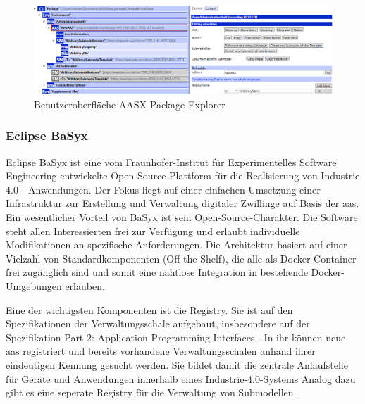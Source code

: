 \begin{figure}[htbp]
    \centering
    \includegraphics[width=1\textwidth]{Bilder/AAS_PE.PNG}
    \caption{Benutzeroberfläche AASX Package Explorer}
    \label{fig:AASXPackageExplorer}
\end{figure}






\newpage
\subsubsection{Eclipse BaSyx }
Eclipse BaSyx ist eine vom Fraunhofer-Institut für Experimentelles Software Engineering entwickelte Open-Source-Plattform für die Realisierung von Industrie 4.0 - Anwendungen.
Der Fokus liegt auf einer einfachen Umsetzung einer Infrastruktur zur Erstellung und Verwaltung digitaler Zwillinge auf Basis der \acs{aas}.
Ein wesentlicher Vorteil von BaSyx ist sein Open-Source-Charakter. Die Software steht allen Interessierten frei zur Verfügung und erlaubt individuelle Modifikationen an spezifische Anforderungen.
Die Architektur basiert auf einer Vielzahl von Standardkomponenten (Off-the-Shelf), die alle als Docker-Container frei zugänglich sind und somit eine nahtlose Integration in bestehende Docker-Umgebungen erlauben.

Eine der wichtigsten Komponenten ist die Registry. 
Sie ist auf den Spezifikationen der Verwaltungsschale aufgebaut, insbesondere auf der Spezifikation Part 2: Application Programming Interfaces \cite{SpezifikationPart2}.
In ihr können neue \acs{aas} registriert und bereits vorhandene Verwaltungsschalen anhand ihrer eindeutigen Kennung gesucht werden.
Sie bildet damit die zentrale Anlaufstelle für Geräte und Anwendungen innerhalb eines Industrie-4.0-Systems
Analog dazu gibt es eine seperate Registry für die Verwaltung von Submodellen.

